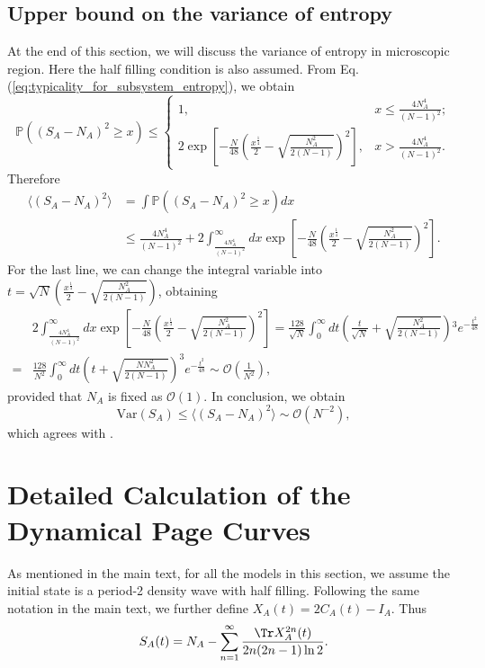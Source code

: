 \subsection{Upper bound on the variance of entropy}

At the end of this section, we will discuss the variance of entropy
in microscopic region. Here the half filling condition is also assumed.
From Eq. (\ref{eq:typicality_for_subsystem_entropy}), we obtain
\[
\mathbb{P}((S_A-N_{A})^{2}\geq x)\leq\begin{cases}
1, & x\leq\frac{4N_{A}^{4}}{(N-1)^{2}};\\
2\exp\left[-\frac{N}{48}\left(\frac{x^{\frac{1}{4}}}{2}-\sqrt{\frac{N_{A}^{2}}{2(N-1)}}\right)^{2}\right], & x>\frac{4N_{A}^{4}}{(N-1)^{2}}.
\end{cases}
\]
Therefore
\begin{align*}
\langle(S_A-N_{A})^{2}\rangle & =\int\mathbb{P}((S_A-N_{A})^{2}\geq x)dx\\
 & \leq\frac{4N_{A}^{4}}{(N-1)^{2}}+2\int_{\frac{4N_{A}^{4}}{(N-1)^{2}}}^{\infty}dx\exp\left[-\frac{N}{48}\left(\frac{x^{\frac{1}{4}}}{2}-\sqrt{\frac{N_{A}^{2}}{2(N-1)}}\right)^{2}\right].
\end{align*}
For the last line, we can change the integral variable into $t=\sqrt{N}\left(\frac{x^{\frac{1}{4}}}{2}-\sqrt{\frac{N_A^2}{2(N-1)}}\right)$, obtaining
\begin{align*}
 & 2\int_{\frac{4N_{A}^{4}}{(N-1)^{2}}}^{\infty}dx\exp\left[-\frac{N}{48}\left(\frac{x^{\frac{1}{4}}}{2}-\sqrt{\frac{N_{A}^{2}}{2(N-1)}}\right)^{2}\right]
=  \frac{128}{\sqrt{N}}\int_{0}^{\infty}dt\left(\frac{t}{\sqrt{N}}+\sqrt{\frac{N_{A}^{2}}{2(N-1)}}\right){}^{3}e^{-\frac{t^{2}}{48}}\\
= & \frac{128}{N^{2}}\int_{0}^{\infty}dt\left(t+\sqrt{\frac{NN_{A}^{2}}{2(N-1)}}\right)^{3}e^{-\frac{t^{2}}{48}}
\sim  \mathcal{O}\left(\frac{1}{N^{2}}\right),
\end{align*}
provided that $N_{A}$ is fixed as $\mathcal{O}(1)$. In conclusion, we obtain
\[
\mathrm{Var}(S_A)\leq\langle(S_A-N_{A})^{2}\rangle\sim\mathcal{O}(N^{-2}), %
\]
which agrees with \citep{Bianchi2021,Bianchi2021a}.


\section{Detailed Calculation of the Dynamical %
Page Curves}
As mentioned in the main text, for all the models in this section, we assume the initial state is a period-2 density wave with half filling. Following the same notation in the main text, we further define $X_{A}(t)=2C_{A}(t)-I_{A}$. Thus
\begin{equation}
S_{A}(t)=N_{A}-\sum_{n=1}^{\infty}\frac{\Tr X_{A}^{2n}(t)}{2n(2n-1)\ln2}.
\label{eq:Expanding_of_entropy_with_X}
\end{equation}

